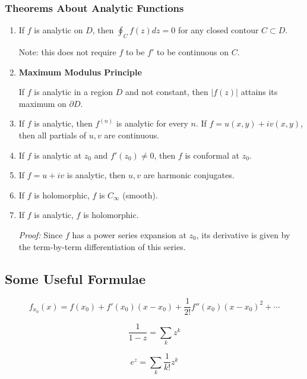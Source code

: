 \documentclass{article}
\begin{document}
\subsubsection{Theorems About Analytic Functions}
\begin{enumerate}

    \item If $f$ is analytic on $D$, then $\oint_C f(z) dz = 0$ for any closed contour $C \subset D$.
    
    Note: this does not require $f$ to be $f'$ to be continuous on $C$.
  
   \item \textbf{Maximum Modulus Principle}
   
   If $f$ is analytic in a region $D$ and not constant, then $|f(z)|$ attains its maximum on $\partial D$.
   
   \item If $f$ is analytic, then $f^{(n)}$ is analytic for every $n$. If $f = u(x,y) + iv(x,y)$, then all partials of $u,v$ are continuous.
   
   \item If $f$ is analytic at $z_0$ and $f'(z_0) \neq 0$, then $f$ is conformal at $z_0$.
   
   \item If $f = u+iv$ is analytic, then $u,v$ are harmonic conjugates.
   
   \item If $f$ is holomorphic, $f$ is $C_\infty$ (smooth).
   
   \item If $f$ is analytic, $f$ is holomorphic.
   
   \textit{Proof:} Since $f$ has a power series expansion at $z_0$, its derivative is given by the term-by-term differentiation of this series.
   
\end{enumerate}


\subsection{Some Useful Formulae}

\[
f_{x_0}(x) = f(x_0) + f'(x_0)(x-x_0) + \frac{1}{2!}f''(x_0)(x-x_0)^2 + \cdots
\]

\[ 
\frac{1}{1-z} = \sum_k z^k
\]

\[ 
e^z = \sum_k \frac{1}{k!} z^k 
\]
\end{document}
